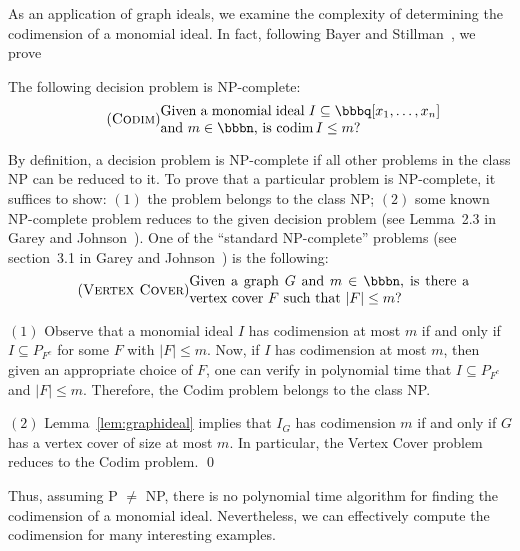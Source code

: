 As an application of graph ideals, we examine the complexity of
determining the codimension of a monomial
ideal.  In fact, following Bayer and Stillman~\cite{MR94f:13018}, we
prove

\begin{proposition} \label{pro:complexity}
The following decision problem is NP-complete: 
\begin{equation} \tag{{\sc Codim}}
\text{\begin{minipage}[c]{200pt}
Given a monomial ideal $I \subseteq \bbbq[x_1, \dotsc, x_n]$
and $m \in \bbbn$, is $\codim I \leq m$?
\end{minipage}}
\end{equation}
\end{proposition}

By definition, a decision problem is NP-complete if
all other problems in the class NP can be reduced to it.  To prove
that a particular problem is NP-complete, it suffices to show: $(1)$
the problem belongs to the class NP; $(2)$ some known NP-complete
problem reduces to the given decision problem (see Lemma~2.3 in Garey
and Johnson~\cite{MR80g:68056}).  One of the ``standard NP-complete''
problems (see section~3.1 in Garey and Johnson~\cite{MR80g:68056}) is
the following:
\begin{equation} \tag{{\sc Vertex Cover}}
\text{\begin{minipage}[c]{200pt} Given a graph $G$ and $m \in \bbbn$,
is there a vertex cover $F$ such that $|F| \leq m$? \end{minipage}}
\end{equation}

\begin{sproof}
$(1)$ Observe that a monomial ideal $I$ has codimension at most $m$ if
and only if $I \subseteq P_{F^{c}}$ for some $F$ with $|F|
\leq m$.  Now, if $I$ has codimension at most $m$, then given an
appropriate choice of $F$, one can verify in polynomial time that $I
\subseteq P_{F^{c}}$ and $|F| \leq m$.  Therefore, the {\sc
Codim} problem belongs to the class NP.

$(2)$ Lemma~\ref{lem:graphideal} implies that $I_{G}$ has codimension
$m$ if and only if $G$ has a vertex cover of size at most $m$.  In
particular, the {\sc Vertex Cover} problem reduces to the {\sc Codim}
problem. \qed
\end{sproof}

Thus, assuming P $\neq$ NP, there is no polynomial time algorithm for
finding the codimension of a monomial ideal.  Nevertheless, we can
effectively compute the codimension for many interesting examples.

